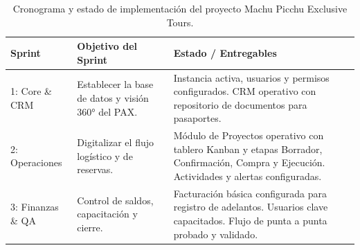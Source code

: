 \begin{table}[h]
\centering
\renewcommand{\arraystretch}{1.5}
\begin{tabular}{|l|p{7cm}|p{5cm}|}
\hline
\textbf{Sprint} & \textbf{Objetivo del Sprint} & \textbf{Estado / Entregables} \\ \hline
1: Core \& CRM & Establecer la base de datos y visión 360° del PAX. & Instancia activa, usuarios y permisos configurados. CRM operativo con repositorio de documentos para pasaportes. \\ \hline
2: Operaciones & Digitalizar el flujo logístico y de reservas. & Módulo de Proyectos operativo con tablero Kanban y etapas Borrador, Confirmación, Compra y Ejecución. Actividades y alertas configuradas. \\ \hline
3: Finanzas \& QA & Control de saldos, capacitación y cierre. & Facturación básica configurada para registro de adelantos. Usuarios clave capacitados. Flujo de punta a punta probado y validado. \\ \hline
\end{tabular}
\caption{Cronograma y estado de implementación del proyecto Machu Picchu Exclusive Tours.}
\end{table}

